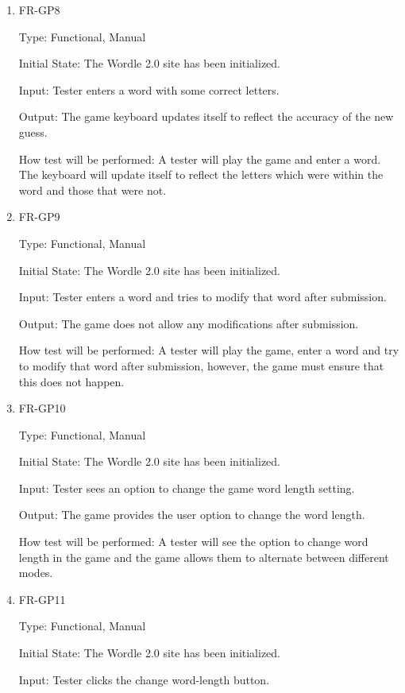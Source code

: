 \documentclass[12pt, titlepage]{article}
\begin{document}
\begin{enumerate}
\item{FR-GP8\\}

Type: Functional, Manual

Initial State: The Wordle 2.0 site has been initialized.

Input: Tester enters a word with some correct letters.

Output: The game keyboard updates itself to reflect the accuracy of the new 
guess.

How test will be performed: A tester will play the game and enter a word. The 
keyboard will update itself to reflect the letters which were within the word 
and those that were not.

\item{FR-GP9\\}

Type: Functional, Manual

Initial State: The Wordle 2.0 site has been initialized.

Input: Tester enters a word and tries to modify that word after submission.

Output: The game does not allow any modifications after submission.

How test will be performed: A tester will play the game, enter a word and try 
to modify that word after submission, however, the game must ensure that this 
does not happen.

\item{FR-GP10\\}

Type: Functional, Manual

Initial State: The Wordle 2.0 site has been initialized.

Input: Tester sees an option to change the game word length setting.

Output: The game provides the user option to change the word length.

How test will be performed: A tester will see the option to change word length 
in the game and the game allows them to alternate between different modes.

\item{FR-GP11\\}

Type: Functional, Manual

Initial State: The Wordle 2.0 site has been initialized.

Input: Tester clicks the change word-length button.


\end{enumerate}
\end{document}
